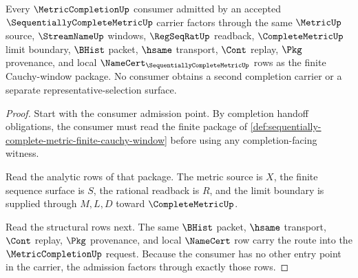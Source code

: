 \begin{theorem}
\label{thm:sequentially-complete-metric-metriccompletion-consumer-admission}
Every $\MetricCompletionUp$ consumer admitted by an accepted $\SequentiallyCompleteMetricUp$ carrier factors through the same $\MetricUp$ source, $\StreamNameUp$ windows, $\RegSeqRatUp$ readback, $\CompleteMetricUp$ limit boundary, $\BHist$ packet, $\hsame$ transport, $\Cont$ replay, $\Pkg$ provenance, and local $\NameCert_{\SequentiallyCompleteMetricUp}$ rows as the finite Cauchy-window package. No consumer obtains a second completion carrier or a separate representative-selection surface.
\end{theorem}
\begin{proof}
Start with the consumer admission point. By completion handoff obligations, the consumer must read the finite package of \autoref{def:sequentially-complete-metric-finite-cauchy-window} before using any completion-facing witness.

Read the analytic rows of that package. The metric source is $X$, the finite sequence surface is $S$, the rational readback is $R$, and the limit boundary is supplied through $M,L,D$ toward $\CompleteMetricUp$.

Read the structural rows next. The same $\BHist$ packet, $\hsame$ transport, $\Cont$ replay, $\Pkg$ provenance, and local $\NameCert$ row carry the route into the $\MetricCompletionUp$ request. Because the consumer has no other entry point in the carrier, the admission factors through exactly those rows.
\end{proof}

